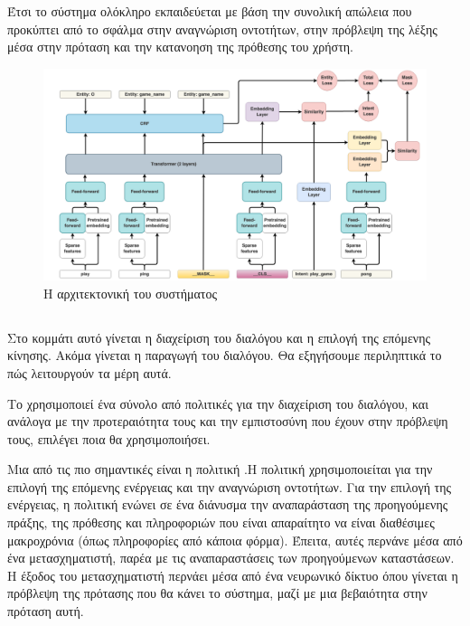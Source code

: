 Έτσι το σύστημα ολόκληρο εκπαιδεύεται με βάση την συνολική απώλεια που προκύπτει από το σφάλμα στην αναγνώριση οντοτήτων, στην πρόβλεψη της λέξης μέσα στην πρόταση και την κατανοηση της πρόθεσης του χρήστη.
\begin{figure}
    \centering
    \includegraphics[width=\textwidth]{body_matter/our_work/images/DIET_architecture.png}
    \caption{Η αρχιτεκτονική του συστήματος \cite{bunk2020diet}}
    \label{fig:diet_architecture}
\end{figure}

\subsection{}

Στο κομμάτι αυτό γίνεται η διαχείριση του διαλόγου και η επιλογή της επόμενης κίνησης. Ακόμα γίνεται η παραγωγή του διαλόγου. Θα εξηγήσουμε περιληπτικά το πώς λειτουργούν τα μέρη αυτά.

Το  χρησιμοποιεί ένα σύνολο από πολιτικές για την διαχείριση του διαλόγου, και ανάλογα με την προτεραιότητα τους και την εμπιστοσύνη που έχουν στην πρόβλεψη τους, επιλέγει ποια θα χρησιμοποιήσει.

Μια από τις πιο σημαντικές είναι η πολιτική .Η πολιτική  χρησιμοποιείται για την επιλογή της επόμενης ενέργειας και την αναγνώριση οντοτήτων. Για την επιλογή της ενέργειας, η πολιτική ενώνει σε ένα διάνυσμα την αναπαράσταση της προηγούμενης πράξης, της πρόθεσης και πληροφοριών που είναι απαραίτητο να είναι διαθέσιμες μακροχρόνια (όπως πληροφορίες από κάποια φόρμα). Έπειτα, αυτές περνάνε μέσα από ένα μετασχηματιστή, παρέα με τις αναπαραστάσεις των προηγούμενων καταστάσεων. Η έξοδος του μετασχηματιστή περνάει μέσα από ένα νευρωνικό δίκτυο όπου γίνεται η πρόβλεψη της πρότασης που θα κάνει το σύστημα, μαζί με μια βεβαιότητα στην πρόταση αυτή.

